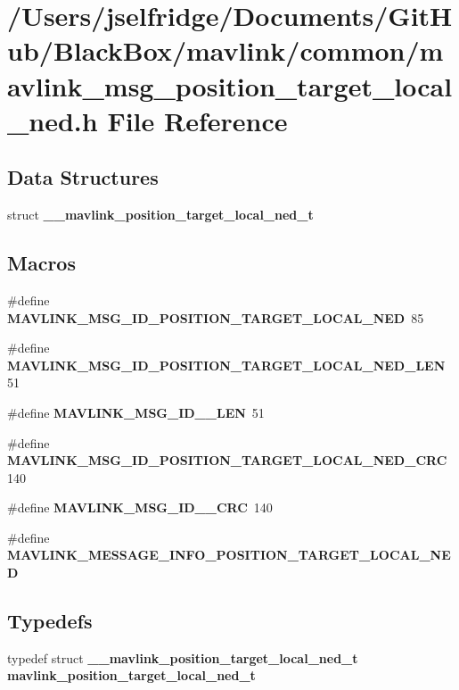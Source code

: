 \section{/\+Users/jselfridge/\+Documents/\+Git\+Hub/\+Black\+Box/mavlink/common/mavlink\+\_\+msg\+\_\+position\+\_\+target\+\_\+local\+\_\+ned.h File Reference}
\label{mavlink__msg__position__target__local__ned_8h}
\subsection*{Data Structures}
\begin{DoxyCompactItemize}
\item 
struct \textbf{ \+\_\+\+\_\+mavlink\+\_\+position\+\_\+target\+\_\+local\+\_\+ned\+\_\+t}
\end{DoxyCompactItemize}
\subsection*{Macros}
\begin{DoxyCompactItemize}
\item 
\#define \textbf{ M\+A\+V\+L\+I\+N\+K\+\_\+\+M\+S\+G\+\_\+\+I\+D\+\_\+\+P\+O\+S\+I\+T\+I\+O\+N\+\_\+\+T\+A\+R\+G\+E\+T\+\_\+\+L\+O\+C\+A\+L\+\_\+\+N\+ED}~85
\item 
\#define \textbf{ M\+A\+V\+L\+I\+N\+K\+\_\+\+M\+S\+G\+\_\+\+I\+D\+\_\+\+P\+O\+S\+I\+T\+I\+O\+N\+\_\+\+T\+A\+R\+G\+E\+T\+\_\+\+L\+O\+C\+A\+L\+\_\+\+N\+E\+D\+\_\+\+L\+EN}~51
\item 
\#define \textbf{ M\+A\+V\+L\+I\+N\+K\+\_\+\+M\+S\+G\+\_\+\+I\+D\+\_\+\_\+\+L\+EN}~51
\item 
\#define \textbf{ M\+A\+V\+L\+I\+N\+K\+\_\+\+M\+S\+G\+\_\+\+I\+D\+\_\+\+P\+O\+S\+I\+T\+I\+O\+N\+\_\+\+T\+A\+R\+G\+E\+T\+\_\+\+L\+O\+C\+A\+L\+\_\+\+N\+E\+D\+\_\+\+C\+RC}~140
\item 
\#define \textbf{ M\+A\+V\+L\+I\+N\+K\+\_\+\+M\+S\+G\+\_\+\+I\+D\+\_\+\_\+\+C\+RC}~140
\item 
\#define \textbf{ M\+A\+V\+L\+I\+N\+K\+\_\+\+M\+E\+S\+S\+A\+G\+E\+\_\+\+I\+N\+F\+O\+\_\+\+P\+O\+S\+I\+T\+I\+O\+N\+\_\+\+T\+A\+R\+G\+E\+T\+\_\+\+L\+O\+C\+A\+L\+\_\+\+N\+ED}
\end{DoxyCompactItemize}
\subsection*{Typedefs}
\begin{DoxyCompactItemize}
\item 
typedef struct \textbf{ \+\_\+\+\_\+mavlink\+\_\+position\+\_\+target\+\_\+local\+\_\+ned\+\_\+t} \textbf{ mavlink\+\_\+position\+\_\+target\+\_\+local\+\_\+ned\+\_\+t}
\end{DoxyCompactItemize}


